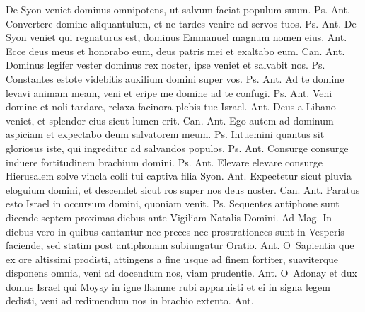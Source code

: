 \begin{multicols*}{2}
 De Syon veniet dominus omnipotens, ut salvum faciat populum suum. {\color{Red} Ps.}  {\color{Red} Ant.} Convertere domine aliquantulum, et ne tardes venire ad servos tuos. {\color{Red} Ps.}  {\color{Red} Ant.} De Syon veniet qui regnaturus est, dominus Emmanuel magnum nomen eius.  {\color{Red} Ant.} Ecce deus meus et honorabo eum, deus patris mei et exaltabo eum. {\color{Red} Can.}  {\color{Red} Ant.} Dominus legifer vester dominus rex noster, ipse veniet et salvabit nos. {\color{Red} Ps.} 
 Constantes estote videbitis auxilium domini super vos. {\color{Red} Ps.}  {\color{Red} Ant.} Ad te domine levavi animam meam, veni et eripe me domine ad te confugi. {\color{Red} Ps.}  {\color{Red} Ant.} Veni domine et noli tardare, relaxa facinora plebis tue Israel.  {\color{Red} Ant.} Deus a Libano veniet, et splendor eius sicut lumen erit. {\color{Red} Can.}  {\color{Red} Ant.} Ego autem ad dominum aspiciam et expectabo deum salvatorem meum. {\color{Red} Ps.} 
 Intuemini quantus sit gloriosus iste, qui ingreditur ad salvandos populos. {\color{Red} Ps.}  {\color{Red} Ant.} Consurge consurge induere fortitudinem brachium domini. {\color{Red} Ps.}  {\color{Red} Ant.} Elevare elevare consurge Hierusalem solve vincla colli tui captiva filia Syon.  {\color{Red} Ant.} Expectetur sicut pluvia eloguium domini, et descendet sicut ros super nos deus noster. {\color{Red} Can.}  {\color{Red} Ant.} Paratus esto Israel in occursum domini, quoniam venit. {\color{Red} Ps.} 
{\color{Red} }
Sequentes antiphone sunt dicende septem proximas diebus ante Vigiliam Natalis Domini. Ad Mag. In diebus vero in quibus cantantur nec preces nec prostrationces sunt in Vesperis faciende, sed statim post antiphonam subiungatur Oratio. {\color{Red} Ant.}
\lettrine[lines=2]{\zallmancaps \color{Red} O}{}\ Sapientia que ex ore altissimi prodisti, attingens a fine usque ad finem fortiter, suaviterque disponens omnia, veni ad docendum nos, viam prudentie. {\color{Red} Ant.}
\lettrine[lines=2]{\zallmancaps \color{Blue} O}{}\ Adonay et dux domus Israel qui Moysy in igne flamme rubi apparuisti et ei in signa legem dedisti, veni ad redimendum nos in brachio extento. {\color{Red} Ant.}

\end{multicols*}

